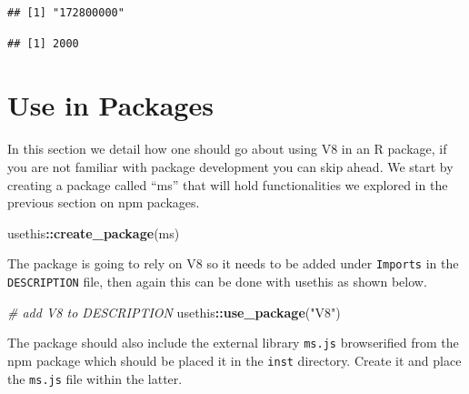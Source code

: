 \documentclass[
]{krantz}
\makeatletter
\newenvironment{Shaded}{\begin{snugshade}}{\end{snugshade}}
\newcommand{\CommentTok}[1]{\textcolor[rgb]{0.37,0.37,0.37}{\textit{#1}}}
\newcommand{\KeywordTok}[1]{\textcolor[rgb]{0.27,0.27,0.27}{\textbf{#1}}}
\newcommand{\NormalTok}[1]{#1}
\newcommand{\OperatorTok}[1]{\textcolor[rgb]{0.43,0.43,0.43}{\textbf{#1}}}
\newcommand{\StringTok}[1]{\textcolor[rgb]{0.5,0.5,0.5}{#1}}
\newenvironment{kframe}{%
\medskip{}
\setlength{\fboxsep}{.8em}
 \def\at@end@of@kframe{}%
 \ifinner\ifhmode%
  \def\at@end@of@kframe{\end{minipage}}%
  \begin{minipage}{\columnwidth}%
 \fi\fi%
 \def\FrameCommand##1{\hskip\@totalleftmargin \hskip-\fboxsep
 \colorbox{shadecolor}{##1}\hskip-\fboxsep
     \hskip-\linewidth \hskip-\@totalleftmargin \hskip\columnwidth}%
 \MakeFramed {\advance\hsize-\width
   \@totalleftmargin\z@ \linewidth\hsize
   \@setminipage}}%
 {\par\unskip\endMakeFramed%
 \at@end@of@kframe}
\renewenvironment{Shaded}{\begin{kframe}}{\end{kframe}}
\makeatother
\begin{document}
\begin{verbatim}
## [1] "172800000"
\end{verbatim}

\begin{Shaded}
\end{Shaded}

\begin{verbatim}
## [1] 2000
\end{verbatim}

\hypertarget{v8-pkg}{%
\section{Use in Packages}\label{v8-pkg}}

In this section we detail how one should go about using V8 in an R package, if you are not familiar with package development you can skip ahead. We start by creating a package called ``ms'' that will hold functionalities we explored in the previous section on npm packages.

\begin{Shaded}
\begin{Highlighting}[]
\NormalTok{usethis}\OperatorTok{::}\KeywordTok{create\_package}\NormalTok{(}\StringTok{\textquotesingle{}ms\textquotesingle{}}\NormalTok{)}
\end{Highlighting}
\end{Shaded}

The package is going to rely on V8 so it needs to be added under \texttt{Imports} in the \texttt{DESCRIPTION} file, then again this can be done with usethis as shown below.

\begin{Shaded}
\begin{Highlighting}[]
\CommentTok{\# add V8 to DESCRIPTION}
\NormalTok{usethis}\OperatorTok{::}\KeywordTok{use\_package}\NormalTok{(}\StringTok{"V8"}\NormalTok{)}
\end{Highlighting}
\end{Shaded}

The package should also include the external library \texttt{ms.js} browserified from the npm package which should be placed it in the \texttt{inst} directory. Create it and place the \texttt{ms.js} file within the latter.
\end{document}
